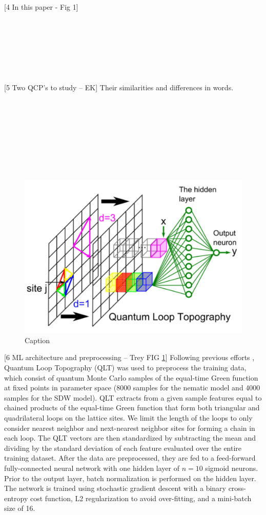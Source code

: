\documentclass[amsmath,amssymb, aps, prx, longbibliography, twocolumn]{revtex4-1}
\begin{document}
[4 In this paper - Fig 1] 
\\
\\
\\
\\
\\
\\
\\
\\


[5 Two QCP's to study -- EK]
Their similarities and differences in words.
\\
\\
\\
\\
\\
\\
\\
\\
\\

 \begin{figure} [t]
    \centering
\includegraphics[width=.5\textwidth]{qlt.png}
    \caption{Caption}
    \label{fig:qlt}
\end{figure}
[6 ML architecture and preprocessing -- Trey FIG \ref{fig:qlt}]
Following previous efforts \cite{Zhang2019}, Quantum Loop Topography (QLT) was used to preprocess the training data, which consist of quantum Monte Carlo samples of the equal-time Green function at fixed points in parameter space (8000 samples for the nematic model and 4000 samples for the SDW model). QLT extracts from a given sample features equal to chained products of the equal-time Green function that form both triangular and quadrilateral loops on the lattice sites. We limit the length of the loops to only consider nearest neighbor and next-nearest neighbor sites for forming a chain in each loop. The QLT vectors are then standardized by subtracting the mean and dividing by the standard deviation of each feature evaluated over the entire training dataset. After the data are preprocessed, they are fed to a feed-forward fully-connected neural network with one hidden layer of $n=10$ sigmoid neurons. Prior to the output layer, batch normalization is performed on the hidden layer. The network is trained using stochastic gradient descent with a binary cross-entropy cost function, L2 regularization to avoid over-fitting, and a mini-batch size of 16. \\ 
\end{document}
